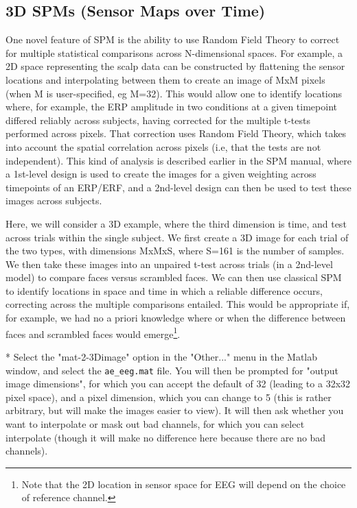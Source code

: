 \subsection{3D SPMs (Sensor Maps over Time) \label{3DSPM}}

One novel feature of SPM is the ability to use Random Field Theory to correct for multiple statistical comparisons across N-dimensional spaces. For example, a 2D space representing the scalp data can be constructed by flattening the sensor locations and interpolating between them to create an image of MxM pixels (when M is user-specified, eg M=32). This would allow one to identify locations where, for example, the ERP amplitude in two conditions at a given timepoint differed reliably across subjects, having corrected for the multiple t-tests performed across pixels. That correction uses Random Field Theory, which takes into account the spatial correlation across pixels (i.e, that the tests are not independent). This kind of analysis is described earlier in the SPM manual, where a 1st-level design is used to create the images for a given weighting across timepoints of an ERP/ERF, and a 2nd-level design can then be used to test these images across subjects.

Here, we will consider a 3D example, where the third dimension is time, and test across trials within the single subject. We first create a 3D image for each trial of the two types, with dimensions MxMxS, where S=161 is the number of samples. We then take these images into an unpaired t-test across trials (in a 2nd-level model) to compare faces versus scrambled faces. We can then use classical SPM to identify locations in space and time in which a reliable difference occurs, correcting across the multiple comparisons entailed. This would be appropriate if, for example, we had no a priori knowledge where or when the difference between faces and scrambled faces would emerge\footnote{Note that the 2D location in sensor space for EEG will depend on the choice of reference channel.}.

* Select the "mat-2-3Dimage" option in the "Other..." menu in the Matlab window, and select the \verb!ae_eeg.mat! file. You will then be prompted for "output image dimensions", for which you can accept the default of 32 (leading to a 32x32 pixel space), and a pixel dimension, which you can change to 5 (this is rather arbitrary, but will make the images easier to view). It will then ask whether you want to interpolate or mask out bad channels, for which you can select interpolate (though it will make no difference here because there are no bad channels).

